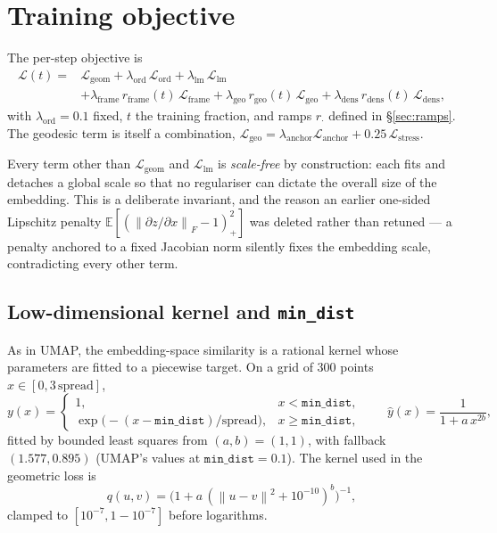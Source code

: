 \documentclass[12pt]{iopart}
\theoremstyle{definition}
\theoremstyle{plain}
\theoremstyle{remark}
\newcommand{\E}{\mathbb{E}}
\newcommand{\norm}[1]{\left\lVert#1\right\rVert}
\newcommand{\loss}{\mathcal{L}}
\newcommand{\code}[1]{\texttt{#1}}
\begin{document}
\section{Training objective}
\label{sec:loss}

The per-step objective is
\begin{equation}
\label{eq:total}
\begin{aligned}
\loss(t)
={}& \loss_{\mathrm{geom}}
   + \lambda_{\mathrm{ord}}\,\loss_{\mathrm{ord}}
   + \lambda_{\mathrm{lm}}\,\loss_{\mathrm{lm}} \\
   &+ \lambda_{\mathrm{frame}}\,r_{\mathrm{frame}}(t)\,\loss_{\mathrm{frame}}
   + \lambda_{\mathrm{geo}}\,r_{\mathrm{geo}}(t)\,\loss_{\mathrm{geo}}
   + \lambda_{\mathrm{dens}}\,r_{\mathrm{dens}}(t)\,\loss_{\mathrm{dens}},
\end{aligned}
\end{equation}
with $\lambda_{\mathrm{ord}}=0.1$ fixed, $t$ the training fraction, and ramps
$r_\cdot$ defined in \S\ref{sec:ramps}. The geodesic term is itself a
combination,
$\loss_{\mathrm{geo}}=\lambda_{\mathrm{anchor}}\loss_{\mathrm{anchor}}
+0.25\,\loss_{\mathrm{stress}}$.

Every term other than $\loss_{\mathrm{geom}}$ and $\loss_{\mathrm{lm}}$ is
\emph{scale-free} by construction: each fits and detaches a global scale so
that no regulariser can dictate the overall size of the embedding. This is a
deliberate invariant, and the reason an earlier one-sided Lipschitz penalty
$\E[(\norm{\partial z/\partial x}_F-1)_+^2]$ was deleted rather than retuned ---
a penalty anchored to a fixed Jacobian norm silently fixes the embedding scale,
contradicting every other term.

\subsection{Low-dimensional kernel and \texorpdfstring{\code{min\_dist}}{min\_dist}}
\label{sec:ab}

As in UMAP, the embedding-space similarity is a rational kernel whose
parameters are fitted to a piecewise target. On a grid of $300$ points
$x\in[0,3\,\mathrm{spread}]$,
\begin{equation}
\label{eq:target}
y(x)
=
\begin{cases}
1, & x<\code{min\_dist},\\
\exp\bigl(-(x-\code{min\_dist})/\mathrm{spread}\bigr), & x\ge\code{min\_dist},
\end{cases}
\qquad
\hat y(x)=\frac{1}{1+a\,x^{2b}},
\end{equation}
fitted by bounded least squares from $(a,b)=(1,1)$, with fallback
$(1.577,0.895)$ (UMAP's values at $\code{min\_dist}=0.1$). The kernel used in
the geometric loss is
\begin{equation}
\label{eq:q}
q(u,v) = \bigl(1 + a\,(\norm{u-v}^2+10^{-10})^{b}\bigr)^{-1},
\end{equation}
clamped to $[10^{-7},1-10^{-7}]$ before logarithms.
\end{document}
